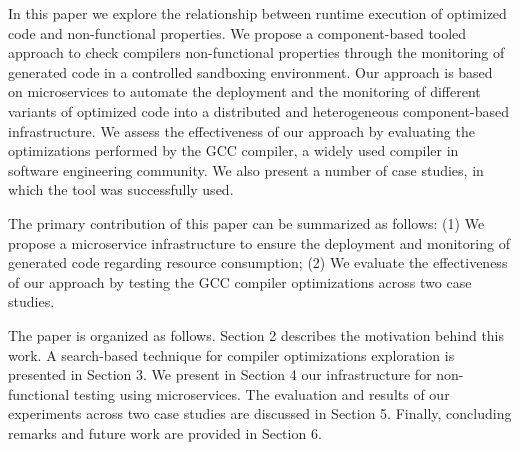 In this paper we explore the relationship between runtime execution of optimized code and non-functional properties.
We propose a component-based tooled approach to check compilers non-functional properties through the monitoring of generated code in a controlled sandboxing environment. 
Our approach is based on microservices to automate the deployment and the monitoring of different variants of optimized code into a distributed and heterogeneous component-based infrastructure. 
We assess the effectiveness of our approach by evaluating the optimizations performed by the GCC compiler, a widely used compiler in software engineering community. 
We also present a number of case studies, in which the tool was successfully used.

The primary contribution of this paper can be summarized as follows: 
(1) We propose a microservice infrastructure to ensure the deployment and monitoring of generated code regarding resource consumption; 
(2) We evaluate the effectiveness of our approach by testing the GCC compiler optimizations across two case studies.
 

The paper is organized as follows.
Section 2 describes the motivation behind this work. A search-based technique for compiler optimizations exploration is presented in Section 3. 
We present in Section 4 our infrastructure for non-functional testing using microservices. 
The evaluation and results of our experiments across two case studies are discussed in Section 5. 
Finally, concluding remarks and future work are provided in Section 6.




 
 

